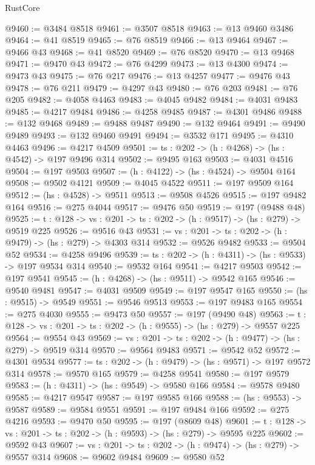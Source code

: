 \begin{lexlean}{RustCore}
\begin{coremodule}
@9460 := @3484 @8518
@9461 := @3507 @8518
@9463 := @13 @9460 @3486
@9464 := @41 @8519
@9465 := @76 @8519
@9466 := @13 @9464
@9467 := @9466 @43
@9468 := @41 @8520
@9469 := @76 @8520
@9470 := @13 @9468
@9471 := @9470 @43
@9472 := @76 @4299
@9473 := @13 @4300
@9474 := @9473 @43
@9475 := @76 @217
@9476 := @13 @4257
@9477 := @9476 @43
@9478 := @76 @211
@9479 := @4297 @43
@9480 := @76 @203
@9481 := @76 @205
@9482 := @4058 @4463
@9483 := @4045 @9482
@9484 := @4031 @9483
@9485 := @4217 @9484
@9486 := @4258 @9485
@9487 := @4301 @9486
@9488 := @132 @9468
@9489 := @9488 @9487
@9490 := @132 @9464
@9491 := @9490 @9489
@9493 := @132 @9460 @9491
@9494 := @3532 @171
@9495 := @4310 @4463
@9496 := @4217 @4509
@9501 := {ts : @202} -> (h : @4268) -> (hs : @4542) -> @197 @9496 @314
@9502 := @9495 @163
@9503 := @4031 @4516
@9504 := @197 @9503
@9507 := (h : @4122) -> (hs : @4524) -> @9504 @164
@9508 := @9502 @4121
@9509 := @4045 @4522
@9511 := @197 @9509 @164
@9512 := (hs : @4528) -> @9511
@9513 := @9508 @4526
@9515 := @197 @9482 @164
@9516 := @275 @4044
@9517 := @9476 @50
@9519 := @197 (@9488 @48)
@9525 := {t : @128} -> {vs : @201} -> {ts : @202} -> (h : @9517) -> (hs : @279) -> @9519 @225
@9526 := @9516 @43
@9531 := {vs : @201} -> {ts : @202} -> (h : @9479) -> (hs : @279) -> @4303 @314
@9532 := @9526 @9482
@9533 := @9504 @52
@9534 := @4258 @9496
@9539 := {ts : @202} -> (h : @4311) -> (hs : @9533) -> @197 @9534 @314
@9540 := @9532 @164
@9541 := @4217 @9503
@9542 := @197 @9541
@9545 := (h : @4268) -> (hs : @9511) -> @9542 @165
@9546 := @9540 @9481
@9547 := @4031 @9509
@9549 := @197 @9547 @165
@9550 := (hs : @9515) -> @9549
@9551 := @9546 @9513
@9553 := @197 @9483 @165
@9554 := @275 @4030
@9555 := @9473 @50
@9557 := @197 (@9490 @48)
@9563 := {t : @128} -> {vs : @201} -> {ts : @202} -> (h : @9555) -> (hs : @279) -> @9557 @225
@9564 := @9554 @43
@9569 := {vs : @201} -> {ts : @202} -> (h : @9477) -> (hs : @279) -> @9519 @314
@9570 := @9564 @9483
@9571 := @9542 @52
@9572 := @4301 @9534
@9577 := {ts : @202} -> (h : @9479) -> (hs : @9571) -> @197 @9572 @314
@9578 := @9570 @165
@9579 := @4258 @9541
@9580 := @197 @9579
@9583 := (h : @4311) -> (hs : @9549) -> @9580 @166
@9584 := @9578 @9480
@9585 := @4217 @9547
@9587 := @197 @9585 @166
@9588 := (hs : @9553) -> @9587
@9589 := @9584 @9551
@9591 := @197 @9484 @166
@9592 := @275 @4216
@9593 := @9470 @50
@9595 := @197 (@8609 @48)
@9601 := {t : @128} -> {vs : @201} -> {ts : @202} -> (h : @9593) -> (hs : @279) -> @9595 @225
@9602 := @9592 @43
@9607 := {vs : @201} -> {ts : @202} -> (h : @9474) -> (hs : @279) -> @9557 @314
@9608 := @9602 @9484
@9609 := @9580 @52

\end{coremodule}
\end{lexlean}
